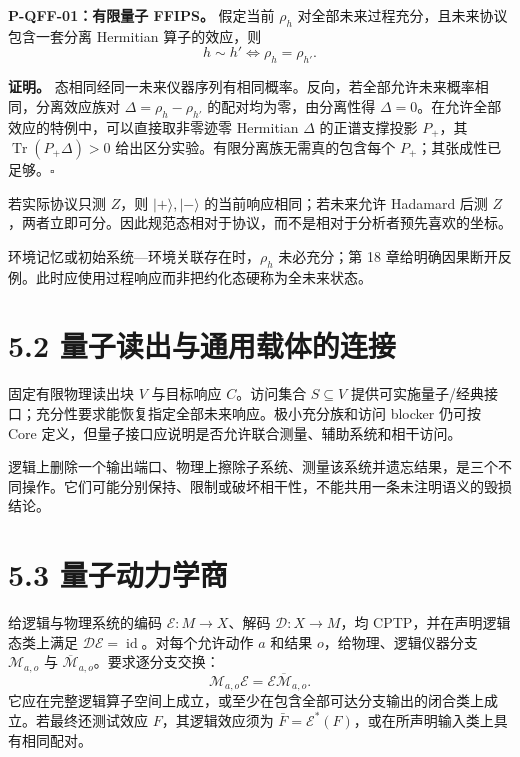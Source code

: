 \documentclass[
  11pt,
  oneside]{book}
\begin{document}
\protect\hypertarget{p-qff-01}{}{}

\textbf{P-QFF-01：有限量子 FFIPS。} 假定当前 \(\rho_h\)
对全部未来过程充分，且未来协议包含一套分离 Hermitian 算子的效应，则 \[
h\sim h'\iff\rho_h=\rho_{h'}.
\]

\textbf{证明。}
态相同经同一未来仪器序列有相同概率。反向，若全部允许未来概率相同，分离效应族对
\(\Delta=\rho_h-\rho_{h'}\) 的配对均为零，由分离性得
\(\Delta=0\)。在允许全部效应的特例中，可以直接取非零迹零 Hermitian
\(\Delta\) 的正谱支撑投影 \(P_+\)，其 \(\operatorname{Tr}(P_+\Delta)>0\)
给出区分实验。有限分离族无需真的包含每个
\(P_+\)；其张成性已足够。\(\square\)

若实际协议只测 \(Z\)，则 \(|+\rangle,|-\rangle\)
的当前响应相同；若未来允许 Hadamard 后测
\(Z\)，两者立即可分。因此规范态相对于协议，而不是相对于分析者预先喜欢的坐标。

环境记忆或初始系统---环境关联存在时，\(\rho_h\) 未必充分；第 18
章给明确因果断开反例。此时应使用过程响应而非把约化态硬称为全未来状态。

\section{5.2 量子读出与通用载体的连接}

固定有限物理读出块 \(V\) 与目标响应 \(C\)。访问集合 \(S\subseteq V\)
提供可实施量子/经典接口；充分性要求能恢复指定全部未来响应。极小充分族和访问
blocker 仍可按 Core
定义，但量子接口应说明是否允许联合测量、辅助系统和相干访问。

逻辑上删除一个输出端口、物理上擦除子系统、测量该系统并遗忘结果，是三个不同操作。它们可能分别保持、限制或破坏相干性，不能共用一条未注明语义的毁损结论。

\section{5.3 量子动力学商}

给逻辑与物理系统的编码 \(\mathcal E:M\to X\)、解码
\(\mathcal D:X\to M\)，均 CPTP，并在声明逻辑态类上满足
\(\mathcal D\mathcal E=\operatorname{id}\)。对每个允许动作 \(a\) 和结果
\(o\)，给物理、逻辑仪器分支 \(\mathcal M_{a,o}\) 与
\(\overline{\mathcal M}_{a,o}\)。要求逐分支交换： \[
\mathcal M_{a,o}\mathcal E=\mathcal E\overline{\mathcal M}_{a,o}.
\]
它应在完整逻辑算子空间上成立，或至少在包含全部可达分支输出的闭合类上成立。若最终还测试效应
\(F\)，其逻辑效应须为
\(\bar F=\mathcal E^*(F)\)，或在所声明输入类上具有相同配对。

\protect\hypertarget{p-qff-02}{}{}
\end{document}
